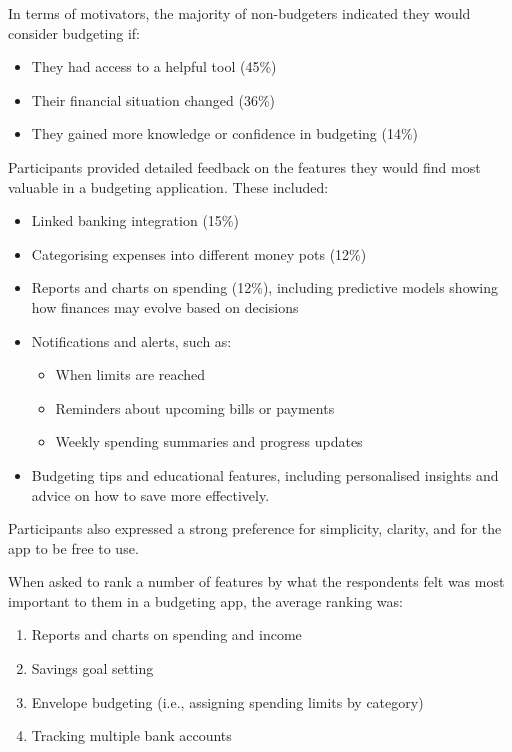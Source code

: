 \documentclass{l4proj}
\begin{document}
\begin{appendices}
In terms of motivators, the majority of non-budgeters indicated they would consider budgeting if:
\begin{itemize}
    \item They had access to a helpful tool (45\%)
    \item Their financial situation changed (36\%)
    \item They gained more knowledge or confidence in budgeting (14\%)
\end{itemize}

Participants provided detailed feedback on the features they would find most valuable in a budgeting application. These included:
\begin{itemize}
    \item Linked banking integration (15\%)
    \item Categorising expenses into different money pots (12\%)
    \item Reports and charts on spending (12\%), including predictive models showing how finances may evolve based on decisions
    \item Notifications and alerts, such as:
    \begin{itemize}
        \item When limits are reached
        \item Reminders about upcoming bills or payments
        \item Weekly spending summaries and progress updates
    \end{itemize}
    \item Budgeting tips and educational features, including personalised insights and advice on how to save more effectively.
\end{itemize}

Participants also expressed a strong preference for simplicity, clarity, and for the app to be free to use.

When asked to rank a number of features by what the respondents felt was most important to them in a budgeting app, the average ranking was:
\begin{enumerate}
    \item Reports and charts on spending and income
    \item Savings goal setting
    \item Envelope budgeting (i.e., assigning spending limits by category)
    \item Tracking multiple bank accounts
\end{enumerate}


\end{appendices}
\end{document}
